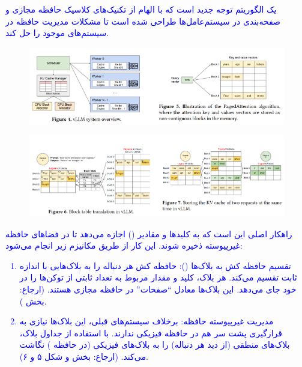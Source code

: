\documentclass[12pt]{article}
\begin{document}
\begin{enumerate}
\begin{enumerate}
        \textcolor{blue}{
         یک الگوریتم توجه جدید است که با الهام از تکنیک‌های کلاسیک حافظه مجازی و صفحه‌بندی در سیستم‌عامل‌ها طراحی شده است تا مشکلات مدیریت حافظه در سیستم‌های موجود را حل کند.
        \begin{figure}[h]
            \centering
            \includegraphics[width=\textwidth]{figs/Q1_2.png}
            \label{fig:num_pic}  
        \end{figure}
        \begin{figure}[h]
            \centering
            \includegraphics[width=\textwidth]{figs/Q1_21.png}
            \label{fig:num_pic}  
        \end{figure}
        راهکار اصلی  این است که به کلیدها و مقادیر () اجازه می‌دهد تا در فضاهای حافظه غیرپیوسته ذخیره شوند. این کار از طریق مکانیزم زیر انجام می‌شود:
        \begin{enumerate}
            \item تقسیم حافظه کش به بلاک‌ها ():  حافظه کش  هر دنباله را به بلاک‌هایی با اندازه ثابت تقسیم می‌کند. هر بلاک، کلید و مقدار مربوط به تعداد ثابتی از توکن‌ها را در خود جای می‌دهد. این بلاک‌ها معادل “صفحات”  در حافظه مجازی هستند. (ارجاع: بخش ).
            \item مدیریت غیرپیوسته حافظه: برخلاف سیستم‌های قبلی، این بلاک‌ها نیازی به قرارگیری پشت سر هم در حافظه فیزیکی  ندارند.  با استفاده از جداول بلاک، بلاک‌های منطقی (از دید هر دنباله) را به بلاک‌های فیزیکی (در حافظه ) نگاشت می‌کند. (ارجاع: بخش  و شکل ۵ و ۶).

\end{enumerate}}
\end{enumerate}
\end{enumerate}
\end{document}
